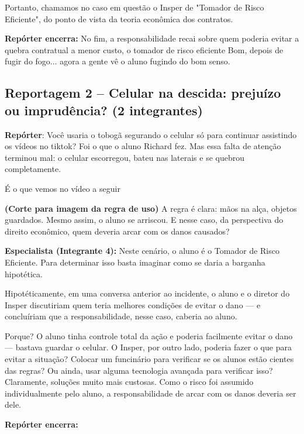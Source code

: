 \documentclass[a4paper,12pt]{article}[abntex2]
\begin{document}
Portanto, chamamos no caso em questão o Insper de "Tomador de Risco Eficiente", do ponto de vista da teoria econômica dos contratos.\newline


\textbf{Repórter encerra:}
No fim, a responsabilidade recai sobre quem poderia evitar a quebra contratual a menor custo, o tomador de risco eficiente\newline
Bom, depois de fugir do fogo... agora a gente vê o aluno fugindo do bom senso.


\subsection*{Reportagem 2 – Celular na descida: prejuízo ou imprudência? (2 integrantes)}

\textbf{Repórter}:
Você usaria o tobogã segurando o celular só para continuar assistindo os vídeos no tiktok? Foi o que o aluno Richard fez. Mas essa falta de atenção terminou mal: o celular escorregou, bateu nas laterais e se quebrou completamente.\newline

É o que vemos no vídeo a seguir


\textbf{(Corte para imagem da regra de uso)}
A regra é clara: mãos na alça, objetos guardados. Mesmo assim, o aluno se arriscou. E nesse caso, da perspectiva do direito econômico, quem deveria arcar com os danos causados?

\textbf{Especialista (Integrante 4):}
Neste cenário, o aluno é o Tomador de Risco Eficiente. Para determinar isso basta imaginar 
como se daria a barganha hipotética. \newline 

Hipotéticamente, em uma conversa anterior ao incidente, o aluno e o diretor do Insper discutiriam quem teria melhores condições de evitar o dano — e concluíriam que a responsabilidade, nesse caso, caberia ao aluno.\newline

Porque? O aluno tinha controle total da ação e poderia facilmente evitar o dano — bastava guardar o celular. O Insper, por outro lado, poderia fazer o que para evitar a situação? Colocar um funcinário para verificar se os alunos estão cientes das regras? Ou ainda, usar alguma tecnologia avançada para verificar isso? Claramente, soluções muito mais custosas. Como o risco foi assumido individualmente pelo aluno, a responsabilidade de arcar com os danos deveria ser dele. 


\textbf{Repórter encerra:}
\end{document}
